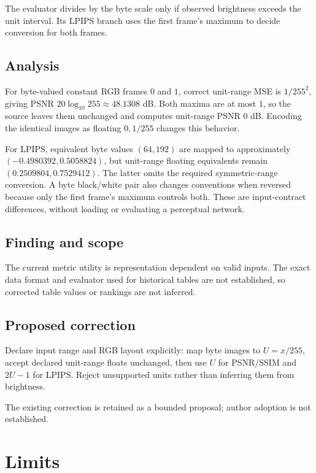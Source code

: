 \documentclass[11pt]{article}
\begin{document}
The evaluator divides by the byte scale only if observed brightness exceeds the unit interval. Its LPIPS branch uses the first frame’s maximum to decide conversion for both frames.

\subsection*{Analysis}

For byte-valued constant RGB frames \(0\) and \(1\), correct unit-range MSE is \(1/255^2\), giving PSNR \(20\log_{10}255\approx48.1308\) dB. Both maxima are at most \(1\), so the source leaves them unchanged and computes unit-range PSNR \(0\) dB. Encoding the identical images as floating \(0,1/255\) changes this behavior.

For LPIPS, equivalent byte values \((64,192)\) are mapped to approximately \((-0.4980392,0.5058824)\), but unit-range floating equivalents remain \((0.2509804,0.7529412)\). The latter omits the required symmetric-range conversion. A byte black/white pair also changes conventions when reversed because only the first frame’s maximum controls both. These are input-contract differences, without loading or evaluating a perceptual network.

\subsection*{Finding and scope}

The current metric utility is representation dependent on valid inputs. The exact data format and evaluator used for historical tables are not established, so corrected table values or rankings are not inferred.

\subsection*{Proposed correction}

Declare input range and RGB layout explicitly: map byte images to \(U=x/255\), accept declared unit-range floats unchanged, then use \(U\) for PSNR/SSIM and \(2U-1\) for LPIPS. Reject unsupported units rather than inferring them from brightness.

The existing correction is retained as a bounded proposal; author adoption is not established.

\section*{Limits}
\end{document}
